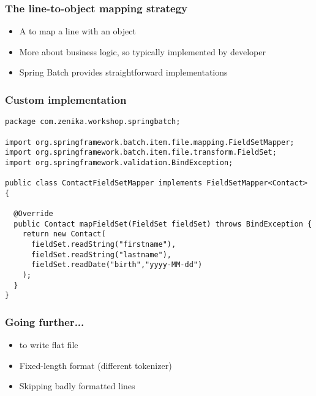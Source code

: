 \begin{frame}
 \frametitle{The line-to-object mapping strategy}
 \begin{itemize}
  \item A  to map a line with an object
  \item More about business logic, so typically implemented by developer
  \item Spring Batch provides straightforward implementations
 \end{itemize}
\end{frame}

\begin{frame}[fragile]
 \frametitle{Custom  implementation}

\lstset{language=Java}
\begin{lstlisting}
package com.zenika.workshop.springbatch;

import org.springframework.batch.item.file.mapping.FieldSetMapper;
import org.springframework.batch.item.file.transform.FieldSet;
import org.springframework.validation.BindException;

public class ContactFieldSetMapper implements FieldSetMapper<Contact> {

  @Override
  public Contact mapFieldSet(FieldSet fieldSet) throws BindException {
    return new Contact(
      fieldSet.readString("firstname"),
      fieldSet.readString("lastname"), 
      fieldSet.readDate("birth","yyyy-MM-dd")
    );
  }
}
\end{lstlisting}

\end{frame}


\begin{frame}
 \frametitle{Going further...}
 \begin{itemize}
  \item {} to write flat file
  \item Fixed-length format (different tokenizer)
  \item Skipping badly formatted lines
 \end{itemize}
\end{frame}
